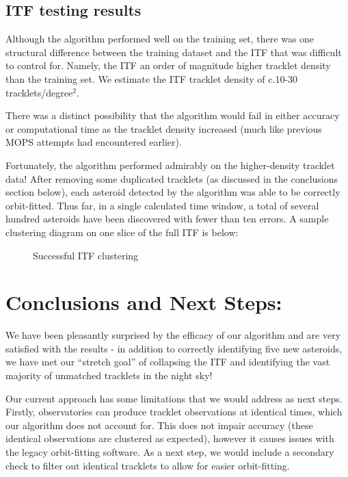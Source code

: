\documentclass[11pt,letter]{article}
\begin{document}
\subsection*{ITF testing results}
    Although the algorithm performed well on the training set, there was one structural difference between the training dataset and the ITF that was difficult to control for.  Namely, the ITF an order of magnitude higher tracklet density than the training set.  We estimate the ITF tracklet density of c.10-30 tracklets/degree$^2$. 
    
    There was a distinct possibility that the algorithm would fail in either accuracy or computational time as the tracklet density increased (much like previous MOPS attempts had encountered earlier).
    
    Fortunately, the algorithm performed admirably on the higher-density tracklet data!  After removing some duplicated tracklets (as discussed in the conclusions section below), each asteroid detected by the algorithm was able to be correctly orbit-fitted.  Thus far, in a single calculated time window, a total of several hundred asteroids have been discovered with fewer than ten errors. A sample clustering diagram on one slice of the full ITF is below:
    \begin{figure}[!htp]%
    \centering
    \qquad
    \caption{Successful ITF clustering}%
    \label{fig:clustering}%
\end{figure}
\newpage
\section*{Conclusions and Next Steps:}
    We have been pleasantly surprised by the efficacy of our algorithm and are very satisfied with the results - in addition to correctly identifying five new asteroids, we have met our ``stretch goal'' of collapsing the ITF and identifying the vast majority of unmatched tracklets in the night sky!

    Our current approach has some limitations that we would address as next steps.  Firstly, observatories can produce tracklet observations at identical times, which our algorithm does not account for.  This does not impair accuracy (these identical observations are clustered as expected), however it causes issues with the legacy orbit-fitting software.  As a next step, we would include a secondary check to filter out identical tracklets to allow for easier orbit-fitting.
\end{document}
